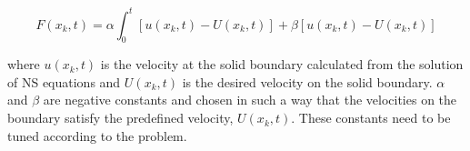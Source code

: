 \begin{equation}\label{eq:C1_feedbackForcing}
	F(x_k, t) = 
	\alpha \int_0^t \left[ u(x_k, t) - U(x_k, t) \right] + 
	\beta \left[ u(x_k, t) - U(x_k, t) \right]
\end{equation}

where $u(x_k, t)$ is the velocity at the solid boundary calculated from the solution of NS equations and $U(x_k, t)$ is the desired velocity on the solid boundary. $\alpha$ and $\beta$ are negative constants and chosen in such a way that the velocities on the boundary satisfy the predefined velocity, $U(x_k, t)$. These constants need to be tuned according to the problem.



